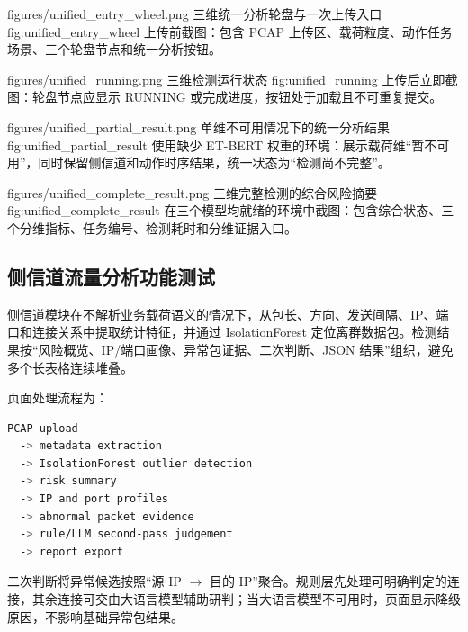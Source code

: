 \RobotSecFigure
  {figures/unified_entry_wheel.png}
  {三维统一分析轮盘与一次上传入口}
  {fig:unified_entry_wheel}
  {上传前截图：包含 PCAP 上传区、载荷粒度、动作任务场景、三个轮盘节点和统一分析按钮。}

\RobotSecFigure
  {figures/unified_running.png}
  {三维检测运行状态}
  {fig:unified_running}
  {上传后立即截图：轮盘节点应显示 RUNNING 或完成进度，按钮处于加载且不可重复提交。}

\RobotSecFigure
  {figures/unified_partial_result.png}
  {单维不可用情况下的统一分析结果}
  {fig:unified_partial_result}
  {使用缺少 ET-BERT 权重的环境：展示载荷维“暂不可用”，同时保留侧信道和动作时序结果，统一状态为“检测尚不完整”。}

\RobotSecFigure
  {figures/unified_complete_result.png}
  {三维完整检测的综合风险摘要}
  {fig:unified_complete_result}
  {在三个模型均就绪的环境中截图：包含综合状态、三个分维指标、任务编号、检测耗时和分维证据入口。}

\subsection{侧信道流量分析功能测试}
\label{subsec:side_channel}

侧信道模块在不解析业务载荷语义的情况下，从包长、方向、发送间隔、IP、端口和连接关系中提取统计特征，并通过 IsolationForest 定位离群数据包。检测结果按“风险概览、IP/端口画像、异常包证据、二次判断、JSON 结果”组织，避免多个长表格连续堆叠。

页面处理流程为：

\begin{lstlisting}[language=bash,caption={侧信道分析流程}]
PCAP upload
  -> metadata extraction
  -> IsolationForest outlier detection
  -> risk summary
  -> IP and port profiles
  -> abnormal packet evidence
  -> rule/LLM second-pass judgement
  -> report export
\end{lstlisting}

二次判断将异常候选按照“源 IP $\rightarrow$ 目的 IP”聚合。规则层先处理可明确判定的连接，其余连接可交由大语言模型辅助研判；当大语言模型不可用时，页面显示降级原因，不影响基础异常包结果。

